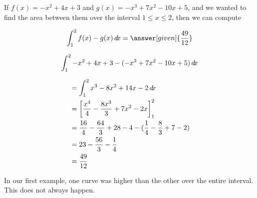 \documentclass{ximera}
\begin{document}
\begin{example}
If  $f(x)= -x^2+4x+3$ and 
$g(x)=-x^3+7x^2-10x+5$, and we wanted to find the area between them over the interval $1 \le x \le 2$, then we can compute

\[ 
\int_1^2 f(x)-g(x)\d x = \answer[given]{\frac{49}{12}} 
\]
\begin{hint}

\[
\int_1^2 -x^2+4x+3-(-x^3+7x^2-10x+5) \mathop{}\!d\! x
\]

\begin{align*}
  &=\int_1^2 x^3-8x^2+14x-2 \mathop{}\!d\! x \\
  &=\bigg[ \frac{x^4}{4}-\frac{8x^3}{3}+7x^2-2x \bigg]_1^2 \\
  &= \frac{16}{4} - \frac{64}{3}+28-4-(\frac{1}{4}- \frac{8}{3}+7-2) \\
  &=23-\frac{56}{3}-\frac{1}{4}\\
  &=\frac{49}{12}
\end{align*}
\end{hint}



\end{example}


In our first example, one curve was higher than the other over the
entire interval. This does not always happen.
\end{document}
